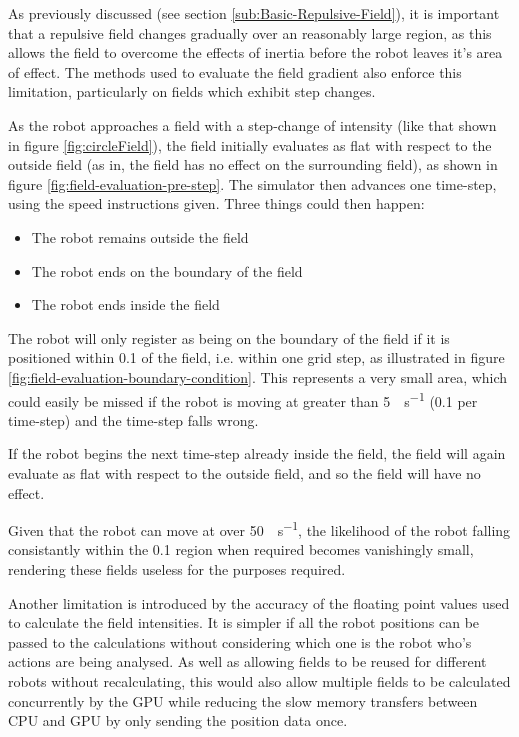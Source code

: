 \documentclass[10pt]{article}
\begin{document}
As previously discussed (see section \ref{sub:Basic-Repulsive-Field}), it is
important that a repulsive field changes gradually over an reasonably large
region, as this allows the field to overcome the effects of inertia before the
robot leaves it's area of effect.  The methods used to evaluate the field
gradient also enforce this limitation, particularly on fields which exhibit step
changes.

As the robot approaches a field with a step-change of intensity (like that shown
in figure \ref{fig:circleField}), the field initially evaluates as flat with
respect to the outside field (as in, the field has no effect on the surrounding
field), as shown in figure \ref{fig:field-evaluation-pre-step}.  The simulator
then advances one time-step, using the speed instructions given.  Three things
could then happen:

\begin{itemize}
  \item The robot remains outside the field
  \item The robot ends on the boundary of the field
  \item The robot ends inside the field
\end{itemize}

The robot will only register as being on the boundary of the field if it is
positioned within \SI{0.1}{\inch} of the field, i.e. within one grid step, as
illustrated in figure \ref{fig:field-evaluation-boundary-condition}.  This
represents a very small area, which could easily be missed if the robot is
moving at greater than \SI{5}{\inch\per\second} (\SI{0.1}{\inch} per time-step)
and the time-step falls wrong.

If the robot begins the next time-step already inside the field, the field will
again evaluate as flat with respect to the outside field, and so the field will
have no effect.

Given that the robot can move at over \SI{50}{\inch\per\second}, the likelihood
of the robot falling consistantly within the \SI{0.1}{\inch} region when
required becomes vanishingly small, rendering these fields useless for the
purposes required.

Another limitation is introduced by the accuracy of the floating point values
used to calculate the field intensities.  It is simpler if all the robot
positions can be passed to the calculations without considering which one is the
robot who's actions are being analysed.  As well as allowing fields to be reused
for different robots without recalculating, this would also allow multiple
fields to be calculated concurrently by the \ac{GPU} while reducing the slow
memory transfers between \ac{CPU} and \ac{GPU} by only sending the position data
once.
\end{document}
